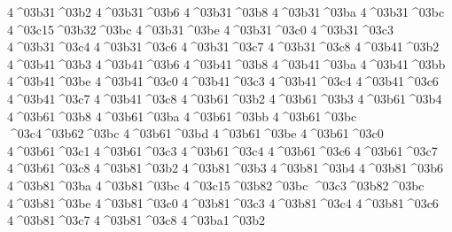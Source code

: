 {4^^^^03b31^^^^03b2
4^^^^03b31^^^^03b6
4^^^^03b31^^^^03b8
4^^^^03b31^^^^03ba
4^^^^03b31^^^^03bc
4^^^^03c15^^^^03b32^^^^03bc %
4^^^^03b31^^^^03be
4^^^^03b31^^^^03c0
4^^^^03b31^^^^03c3
4^^^^03b31^^^^03c4
4^^^^03b31^^^^03c6
4^^^^03b31^^^^03c7
4^^^^03b31^^^^03c8
4^^^^03b41^^^^03b2
4^^^^03b41^^^^03b3
4^^^^03b41^^^^03b6
4^^^^03b41^^^^03b8
4^^^^03b41^^^^03ba
4^^^^03b41^^^^03bb 
4^^^^03b41^^^^03be
4^^^^03b41^^^^03c0
4^^^^03b41^^^^03c3
4^^^^03b41^^^^03c4
4^^^^03b41^^^^03c6
4^^^^03b41^^^^03c7
4^^^^03b41^^^^03c8
4^^^^03b61^^^^03b2 %
4^^^^03b61^^^^03b3 %
4^^^^03b61^^^^03b4
4^^^^03b61^^^^03b8
4^^^^03b61^^^^03ba
4^^^^03b61^^^^03bb
4^^^^03b61^^^^03bc
^^^^03c4^^^^03b62^^^^03bc %
4^^^^03b61^^^^03bd
4^^^^03b61^^^^03be
4^^^^03b61^^^^03c0
4^^^^03b61^^^^03c1
4^^^^03b61^^^^03c3
4^^^^03b61^^^^03c4
4^^^^03b61^^^^03c6
4^^^^03b61^^^^03c7
4^^^^03b61^^^^03c8
4^^^^03b81^^^^03b2
4^^^^03b81^^^^03b3
4^^^^03b81^^^^03b4
4^^^^03b81^^^^03b6
4^^^^03b81^^^^03ba
4^^^^03b81^^^^03bc
4^^^^03c15^^^^03b82^^^^03bc %
^^^^03c3^^^^03b82^^^^03bc   %
4^^^^03b81^^^^03be
4^^^^03b81^^^^03c0
4^^^^03b81^^^^03c3
4^^^^03b81^^^^03c4
4^^^^03b81^^^^03c6
4^^^^03b81^^^^03c7
4^^^^03b81^^^^03c8
4^^^^03ba1^^^^03b2 %
}
